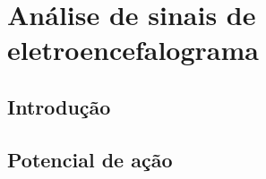 \chapter{Análise de sinais de eletroencefalograma}\label{cap:eeg}
\section{Introdução}\label{sec:eeg_intro}

\section{Potencial de ação}\label{sec:eeg_potencial_acao}
